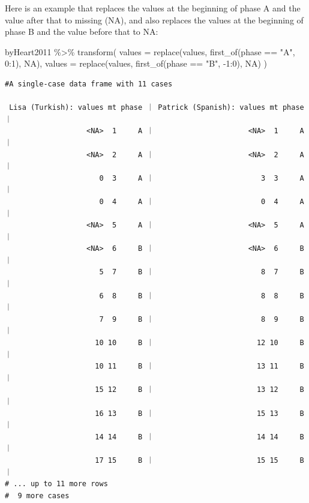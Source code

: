 \documentclass[
  letterpaper,
  DIV=11,
  numbers=noendperiod]{scrreprt}
\newenvironment{Shaded}{\begin{snugshade}}{\end{snugshade}}
\newcommand{\AttributeTok}[1]{\textcolor[rgb]{0.40,0.45,0.13}{#1}}
\newcommand{\ConstantTok}[1]{\textcolor[rgb]{0.56,0.35,0.01}{#1}}
\newcommand{\DecValTok}[1]{\textcolor[rgb]{0.68,0.00,0.00}{#1}}
\newcommand{\FunctionTok}[1]{\textcolor[rgb]{0.28,0.35,0.67}{#1}}
\newcommand{\NormalTok}[1]{\textcolor[rgb]{0.00,0.23,0.31}{#1}}
\newcommand{\SpecialCharTok}[1]{\textcolor[rgb]{0.37,0.37,0.37}{#1}}
\newcommand{\StringTok}[1]{\textcolor[rgb]{0.13,0.47,0.30}{#1}}
\begin{document}
Here is an example that replaces the values at the beginning of phase A
and the value after that to missing (NA), and also replaces the values
at the beginning of phase B and the value before that to NA:

\begin{Shaded}
\begin{Highlighting}[]
\NormalTok{byHeart2011 }\SpecialCharTok{\%\textgreater{}\%}
  \FunctionTok{transform}\NormalTok{(}
    \AttributeTok{values =} \FunctionTok{replace}\NormalTok{(values, }\FunctionTok{first\_of}\NormalTok{(phase }\SpecialCharTok{==} \StringTok{"A"}\NormalTok{, }\DecValTok{0}\SpecialCharTok{:}\DecValTok{1}\NormalTok{), }\ConstantTok{NA}\NormalTok{),}
    \AttributeTok{values =} \FunctionTok{replace}\NormalTok{(values, }\FunctionTok{first\_of}\NormalTok{(phase }\SpecialCharTok{==} \StringTok{"B"}\NormalTok{, }\SpecialCharTok{{-}}\DecValTok{1}\SpecialCharTok{:}\DecValTok{0}\NormalTok{), }\ConstantTok{NA}\NormalTok{)}
\NormalTok{  )}
\end{Highlighting}
\end{Shaded}

\begin{verbatim}
#A single-case data frame with 11 cases

 Lisa (Turkish): values mt phase ｜ Patrick (Spanish): values mt phase ｜
                   <NA>  1     A ｜                      <NA>  1     A ｜
                   <NA>  2     A ｜                      <NA>  2     A ｜
                      0  3     A ｜                         3  3     A ｜
                      0  4     A ｜                         0  4     A ｜
                   <NA>  5     A ｜                      <NA>  5     A ｜
                   <NA>  6     B ｜                      <NA>  6     B ｜
                      5  7     B ｜                         8  7     B ｜
                      6  8     B ｜                         8  8     B ｜
                      7  9     B ｜                         8  9     B ｜
                     10 10     B ｜                        12 10     B ｜
                     10 11     B ｜                        13 11     B ｜
                     15 12     B ｜                        13 12     B ｜
                     16 13     B ｜                        15 13     B ｜
                     14 14     B ｜                        14 14     B ｜
                     17 15     B ｜                        15 15     B ｜
# ... up to 11 more rows
#  9 more cases
\end{verbatim}
\end{document}
